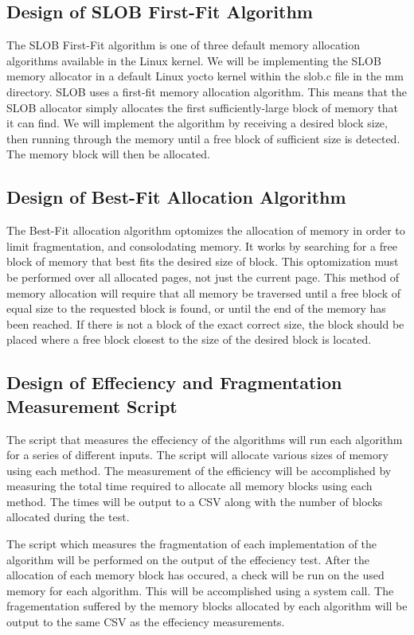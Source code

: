 \documentclass[letterpaper,10pt]{article}
\begin{document}
\subsection{Design of SLOB First-Fit Algorithm}
The SLOB First-Fit algorithm is one of three default memory allocation algorithms available in the 
Linux kernel. We will be implementing the SLOB memory allocator in a default Linux yocto kernel 
within the slob.c file in the mm directory. SLOB uses a first-fit memory allocation algorithm. This 
means that the SLOB allocator simply allocates the first sufficiently-large block of memory that it 
can find. We will implement the algorithm by receiving a desired block size, then running through 
the memory until a free block of sufficient size is detected. The memory block will then be 
allocated.

\subsection{Design of Best-Fit Allocation Algorithm}
The Best-Fit allocation algorithm optomizes the allocation of memory in order to limit 
fragmentation, and consolodating memory. It works by searching for a free block of memory that best 
fits the desired size of block. This optomization must be performed over all allocated pages, not 
just the current page. This method of memory allocation will require that all memory be traversed 
until a free block of equal size to the requested block is found, or until the end of the memory has
 been reached. If there is not a block of the exact correct size, the block should be placed where  a free block closest to the size of the desired block is located.

\subsection{Design of Effeciency and Fragmentation Measurement Script}
The script that measures the effeciency of the algorithms will run each algorithm for a series of 
different inputs. The script will allocate various sizes of memory using each method. The 
measurement of the efficiency will be accomplished by measuring the total time required to allocate 
all memory blocks using each method. The times will be output to a CSV along with the number of 
blocks allocated during the test.

The script which measures the fragmentation of each implementation of the algorithm will be 
performed on the output of the effeciency test. After the allocation of each memory block has 
occured, a check will be run on the used memory for each algorithm. This will be accomplished using 
a system call. The fragementation suffered by the memory blocks allocated by each algorithm will be 
output to the same CSV as the effeciency measurements.
\end{document}
